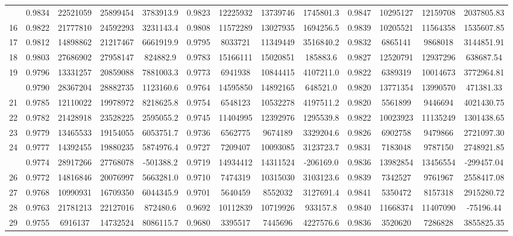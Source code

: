 \documentclass[
  12pt,
]{article}
\begin{document}
\begin{longtable}[t]{lcccccccccccc}
\addlinespace
15 & 0.9834 & 22521059 & 25899454 & 3783913.9 & 0.9823 & 12225932 & 13739746 & 1745801.3 & 0.9847 & 10295127 & 12159708 & 2037805.83\\
16 & 0.9822 & 21777810 & 24592293 & 3231143.4 & 0.9808 & 11572289 & 13027935 & 1694256.5 & 0.9839 & 10205521 & 11564358 & 1535607.85\\
17 & 0.9812 & 14898862 & 21217467 & 6661919.9 & 0.9795 & 8033721 & 11349449 & 3516840.2 & 0.9832 & 6865141 & 9868018 & 3144851.91\\
18 & 0.9803 & 27686902 & 27958147 & 824882.9 & 0.9783 & 15166111 & 15020851 & 185883.6 & 0.9827 & 12520791 & 12937296 & 638687.54\\
19 & 0.9796 & 13331257 & 20859088 & 7881003.3 & 0.9773 & 6941938 & 10844415 & 4107211.0 & 0.9822 & 6389319 & 10014673 & 3772964.81\\
\addlinespace
20 & 0.9790 & 28367204 & 28882735 & 1123160.6 & 0.9764 & 14595850 & 14892165 & 648521.0 & 0.9820 & 13771354 & 13990570 & 471381.33\\
21 & 0.9785 & 12110022 & 19978972 & 8218625.8 & 0.9754 & 6548123 & 10532278 & 4197511.2 & 0.9820 & 5561899 & 9446694 & 4021430.75\\
22 & 0.9782 & 21428918 & 23528225 & 2595055.2 & 0.9745 & 11404995 & 12392976 & 1295539.8 & 0.9822 & 10023923 & 11135249 & 1301438.65\\
23 & 0.9779 & 13465533 & 19154055 & 6053751.7 & 0.9736 & 6562775 & 9674189 & 3329204.6 & 0.9826 & 6902758 & 9479866 & 2721097.30\\
24 & 0.9777 & 14392455 & 19880235 & 5874976.4 & 0.9727 & 7209407 & 10093085 & 3123723.7 & 0.9831 & 7183048 & 9787150 & 2748921.85\\
\addlinespace
25 & 0.9774 & 28917266 & 27768078 & -501388.2 & 0.9719 & 14934412 & 14311524 & -206169.0 & 0.9836 & 13982854 & 13456554 & -299457.04\\
26 & 0.9772 & 14816846 & 20076997 & 5663281.0 & 0.9710 & 7474319 & 10315030 & 3103123.6 & 0.9839 & 7342527 & 9761967 & 2558417.08\\
27 & 0.9768 & 10990931 & 16709350 & 6044345.9 & 0.9701 & 5640459 & 8552032 & 3127691.4 & 0.9841 & 5350472 & 8157318 & 2915280.72\\
28 & 0.9763 & 21781213 & 22127016 & 872480.6 & 0.9692 & 10112839 & 10719926 & 933157.8 & 0.9840 & 11668374 & 11407090 & -75196.44\\
29 & 0.9755 & 6916137 & 14732524 & 8086115.7 & 0.9680 & 3395517 & 7445696 & 4227576.6 & 0.9836 & 3520620 & 7286828 & 3855825.35\\

\end{longtable}
\end{document}
